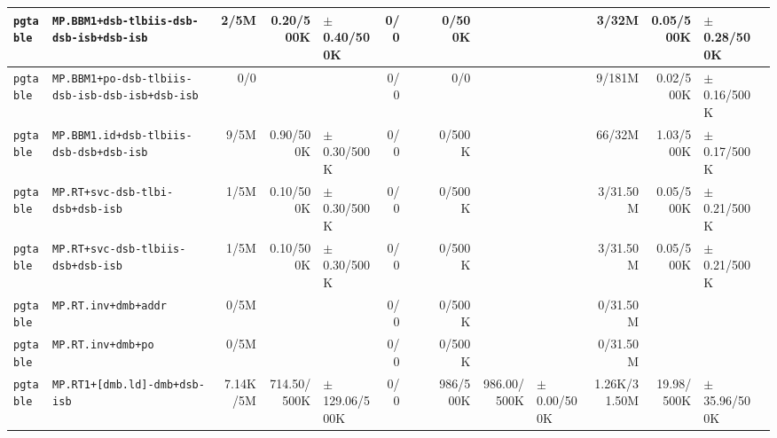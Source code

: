 \begin{tabular}{l l  | r r l | r r l | r r l | r r l l}
        \verb|pgtable| &              \verb|MP.BBM1+dsb-tlbiis-dsb-dsb-isb+dsb-isb| &           2/5M &             0.20/500K &   $\pm$ 0.40/500K &            0/0 &                       &  &         0/500K &                       &                   &          3/32M &             0.05/500K &   $\pm$ 0.28/500K & \\ \hline 
        \verb|pgtable| &       \verb|MP.BBM1+po-dsb-tlbiis-dsb-isb-dsb-isb+dsb-isb| &            0/0 &                       &                   &            0/0 &                       &  &            0/0 &                       &                   &         9/181M &             0.02/500K &   $\pm$ 0.16/500K & \\ \hline 
        \verb|pgtable| &               \verb|MP.BBM1.id+dsb-tlbiis-dsb-dsb+dsb-isb| &           9/5M &             0.90/500K &   $\pm$ 0.30/500K &            0/0 &                       &  &         0/500K &                       &                   &         66/32M &             1.03/500K &   $\pm$ 0.17/500K & \\ \hline 
        \verb|pgtable| &                      \verb|MP.RT+svc-dsb-tlbi-dsb+dsb-isb| &           1/5M &             0.10/500K &   $\pm$ 0.30/500K &            0/0 &                       &  &         0/500K &                       &                   &       3/31.50M &             0.05/500K &   $\pm$ 0.21/500K & \\ \hline 
        \verb|pgtable| &                    \verb|MP.RT+svc-dsb-tlbiis-dsb+dsb-isb| &           1/5M &             0.10/500K &   $\pm$ 0.30/500K &            0/0 &                       &  &         0/500K &                       &                   &       3/31.50M &             0.05/500K &   $\pm$ 0.21/500K & \\ \hline 
        \verb|pgtable| &                                  \verb|MP.RT.inv+dmb+addr| &           0/5M &                       &                   &            0/0 &                       &  &         0/500K &                       &                   &       0/31.50M &                       &                   & \\ \hline 
        \verb|pgtable| &                                    \verb|MP.RT.inv+dmb+po| &           0/5M &                       &                   &            0/0 &                       &  &         0/500K &                       &                   &       0/31.50M &                       &                   & \\ \hline 
        \verb|pgtable| &                         \verb|MP.RT1+[dmb.ld]-dmb+dsb-isb| &       7.14K/5M &           714.50/500K & $\pm$ 129.06/500K &            0/0 &                       &  &       986/500K &           986.00/500K &   $\pm$ 0.00/500K &   1.26K/31.50M &            19.98/500K &  $\pm$ 35.96/500K & \\ \hline 

\end{tabular}
